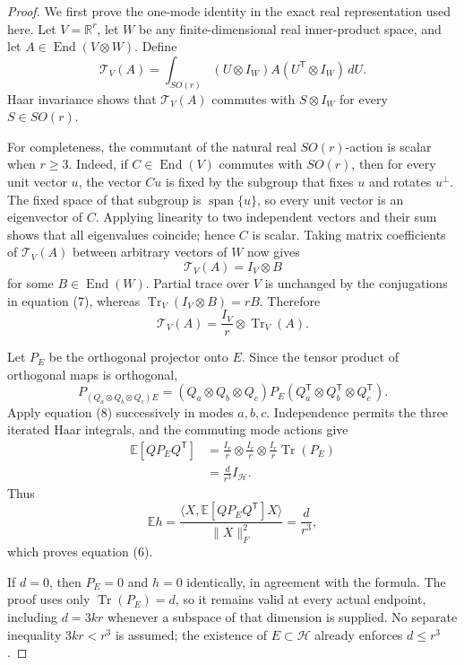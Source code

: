 \begin{proof}
We first prove the one-mode identity in the exact
real representation used here. Let \(V=\mathbb R^r\), let \(W\) be any
finite-dimensional real inner-product space, and let
\(A\in\operatorname{End}(V\otimes W)\). Define
\[
  \mathcal T_V(A)
  =\int_{SO(r)}(U\otimes I_W)A(U^{\mathsf T}\otimes I_W)\,dU. \tag{7}
\]
Haar invariance shows that \(\mathcal T_V(A)\) commutes with
\(S\otimes I_W\) for every \(S\in SO(r)\).

For completeness, the commutant of the natural real \(SO(r)\)-action is
scalar when \(r\ge3\). Indeed, if \(C\in\operatorname{End}(V)\) commutes
with \(SO(r)\), then for every unit vector \(u\), the vector \(Cu\) is fixed
by the subgroup that fixes \(u\) and rotates \(u^\perp\). The fixed space of
that subgroup is \(\operatorname{span}\{u\}\), so every unit vector is an
eigenvector of \(C\). Applying linearity to two independent vectors and their
sum shows that all eigenvalues coincide; hence \(C\) is scalar. Taking matrix
coefficients of \(\mathcal T_V(A)\) between arbitrary vectors of \(W\) now
gives
\[
  \mathcal T_V(A)=I_V\otimes B
\]
for some \(B\in\operatorname{End}(W)\). Partial trace over \(V\) is unchanged
by the conjugations in equation (7), whereas
\(\operatorname{Tr}_V(I_V\otimes B)=rB\). Therefore
\[
  \boxed{\mathcal T_V(A)
  =\frac{I_V}{r}\otimes\operatorname{Tr}_V(A).}             \tag{8}
\]

Let \(P_E\) be the orthogonal projector onto \(E\). Since the tensor product
of orthogonal maps is orthogonal,
\[
  P_{(Q_a\otimes Q_b\otimes Q_c)E}
  =(Q_a\otimes Q_b\otimes Q_c)P_E
   (Q_a^{\mathsf T}\otimes Q_b^{\mathsf T}\otimes Q_c^{\mathsf T}). \tag{9}
\]
Apply equation (8) successively in modes \(a,b,c\). Independence permits the
three iterated Haar integrals, and the commuting mode actions give
\[
\begin{aligned}
  \mathbb E[QP_EQ^{\mathsf T}]
  &=\frac{I_r}{r}\otimes\frac{I_r}{r}\otimes\frac{I_r}{r}
    \operatorname{Tr}(P_E)\\
  &=\frac d{r^3}I_{\mathcal H}.
\end{aligned}\tag{10}
\]
Thus
\[
  \mathbb Eh
  =\frac{\langle X,\mathbb E[QP_EQ^{\mathsf T}]X\rangle}
         {\|X\|_F^2}
  =\frac d{r^3},
\]
which proves equation (6).

If \(d=0\), then \(P_E=0\) and \(h=0\) identically, in agreement with the
formula. The proof uses only \(\operatorname{Tr}(P_E)=d\), so it remains
valid at every actual endpoint, including \(d=3kr\) whenever a subspace of
that dimension is supplied. No separate inequality \(3kr<r^3\) is assumed;
the existence of \(E\subset\mathcal H\) already enforces \(d\le r^3\).


\end{proof}


